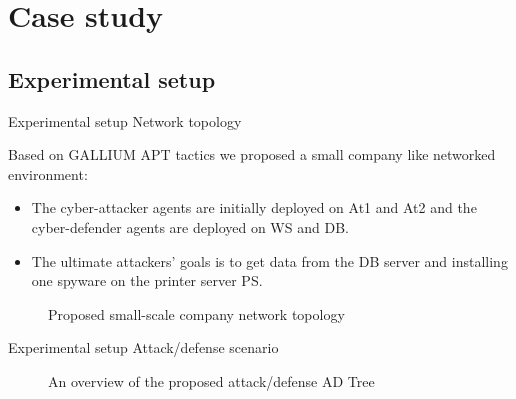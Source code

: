 \AtBeginSection[]{
	\begin{frame}
		\frametitle{}
		\tableofcontents[currentsection]
	\end{frame}
}

 
 \section{Case study}
	
	\subsection{Experimental setup}
	\begin{frame}{Experimental setup}
		{Network topology}

        Based on GALLIUM APT tactics we proposed a small company like networked environment:
        \begin{itemize}
            \item The cyber-attacker agents are initially deployed on At1 and At2 and the cyber-defender agents are deployed on WS and DB.
            \item The ultimate attackers' goals is to get data from the DB server and installing one spyware on the printer server PS.
        \end{itemize}

        \begin{figure}
            \centering
            
            \caption{Proposed small-scale company network topology}
            \label{fig:scenario_network_topology}
        \end{figure}
 
	\end{frame}


	\begin{frame}{Experimental setup}
		{Attack/defense scenario}

        \vspace{-0.15cm}

        \begin{figure}
            \centering
            

            \vspace{-0.2cm}
            
            \caption{An overview of the proposed attack/defense AD Tree}
            \label{fig:ADTree}
        \end{figure}
 
	\end{frame}


